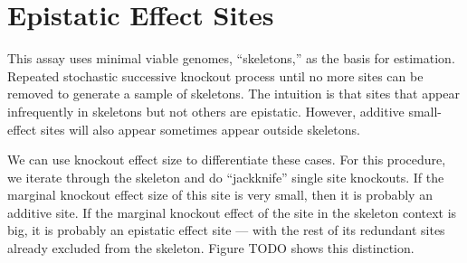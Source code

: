 
\section{Epistatic Effect Sites}

This assay uses minimal viable genomes, ``skeletons,'' as the basis for estimation.
Repeated stochastic successive knockout process until no more sites can be removed to generate a sample of skeletons.
The intuition is that sites that appear infrequently in skeletons but not others are epistatic.
However, additive small-effect sites will also appear sometimes appear outside skeletons.

We can use knockout effect size to differentiate these cases.
For this procedure, we iterate through the skeleton and do ``jackknife'' single site knockouts.
If the marginal knockout effect size of this site is very small, then it is probably an additive site.
If the marginal knockout effect of the site in the skeleton context is big, it is probably an epistatic effect site --- with the rest of its redundant sites already excluded from the skeleton.
Figure TODO shows this distinction.







